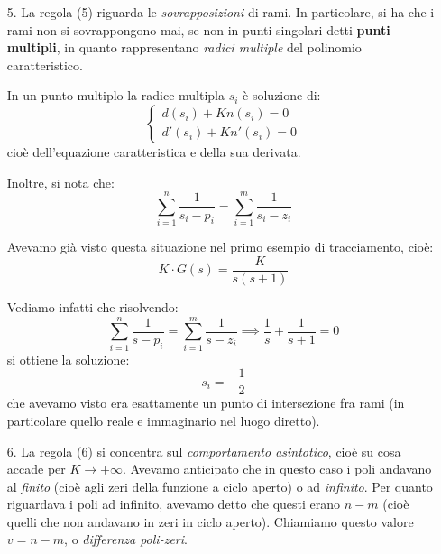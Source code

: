 \documentclass[a4paper,11pt]{article}
\begin{document}
\begin{enumerate}
	\item[5.] La regola (5) riguarda le \textit{sovrapposizioni} di rami.
		In particolare, si ha che i rami non si sovrappongono mai, se non in punti singolari detti \textbf{punti multipli}, in quanto rappresentano \textit{radici multiple} del polinomio caratteristico.

		In un punto multiplo la radice multipla $s_i$ è soluzione di:
		\[
			\begin{cases}
				d(s_i) + Kn(s_i) = 0 \\
				d'(s_i) + K n'(s_i) = 0
			\end{cases}
		\]
		cioè dell'equazione caratteristica e della sua derivata.

		Inoltre, si nota che:
		$$
		\sum_{i = 1}^n \frac{1}{s_i - p_i} = \sum_{i = 1}^m \frac{1}{s_i - z_i}
		$$

		\par\medskip
		\noindent
		\textbf{}

		Avevamo già visto questa situazione nel primo esempio di tracciamento, cioè:
		$$
		K \cdot G(s) = \frac{K}{s(s+1)}
		$$

		Vediamo infatti che risolvendo:
		$$
		\sum_{i = 1}^n \frac{1}{s - p_i} = \sum_{i = 1}^m \frac{1}{s - z_i}
		\implies \frac{1}{s} + \frac{1}{s + 1} = 0
		$$
		si ottiene la soluzione:
		$$
		s_i = -\frac{1}{2}
		$$
		che avevamo visto era esattamente un punto di intersezione fra rami (in particolare quello reale e immaginario nel luogo diretto).

	\item[6.] La regola (6) si concentra sul \textit{comportamento asintotico}, cioè su cosa accade per $K \rightarrow +\infty$.
		Avevamo anticipato che in questo caso i poli andavano al \textit{finito} (cioè agli zeri della funzione a ciclo aperto) o ad \textit{infinito}.
		Per quanto riguardava i poli ad infinito, avevamo detto che questi erano $n - m$ (cioè quelli che non andavano in zeri in ciclo aperto).
		Chiamiamo questo valore $v = n - m$, o \textit{differenza poli-zeri}.


\end{enumerate}
\end{document}

